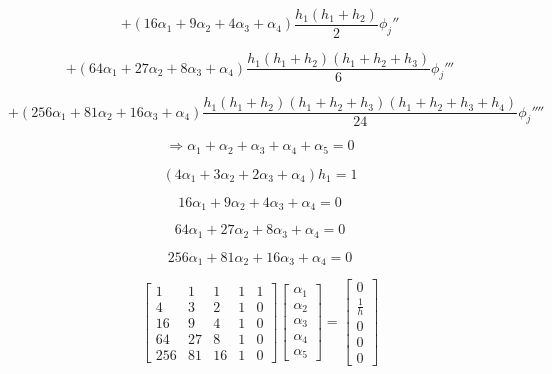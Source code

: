 \documentclass[12pt,a4paper]{report}
\begin{document}
\begin{enumerate}
$$+ \left(16\alpha_1 + 9\alpha_2 + 4\alpha_3 + \alpha_4\right)\frac{h_1\left(h_1 + h_2\right)}{2}{\phi_j}''$$

$$+ \left(64\alpha_1 + 27\alpha_2 + 8\alpha_3 + \alpha_4\right)\frac{h_1\left(h_1 + h_2\right)\left(h_1 + h_2 + h_3\right)}{6}{\phi_j}'''$$

$$+ \left(256\alpha_1 + 81\alpha_2 + 16\alpha_3 + \alpha_4\right)\frac{h_1\left(h_1 + h_2\right)\left(h_1 + h_2 + h_3\right)\left(h_1 + h_2 + h_3 + h_4\right)}{24}{\phi_j}''''$$

$$\Rightarrow \alpha_1 + \alpha_2 + \alpha_3 + \alpha_4 + \alpha_5 = 0$$

$$\left(4\alpha_1 + 3\alpha_2 + 2\alpha_3 + \alpha_4\right)h_1 = 1$$

$$16\alpha_1 + 9\alpha_2 + 4\alpha_3 + \alpha_4 = 0$$

$$64\alpha_1 + 27\alpha_2 + 8\alpha_3 + \alpha_4 = 0$$

$$256\alpha_1 + 81\alpha_2 + 16\alpha_3 + \alpha_4 = 0$$

$$\begin{bmatrix}
1 & 1 & 1 & 1 & 1 \\
4 & 3 & 2 & 1 & 0 \\
16 & 9 & 4 & 1 & 0 \\
64 & 27 & 8 & 1 & 0 \\
256 & 81 & 16 & 1 & 0
\end{bmatrix}
\begin{bmatrix}
\alpha_1 \\ \alpha_2 \\ \alpha_3 \\ \alpha_4 \\ \alpha_5
\end{bmatrix} = 
\begin{bmatrix}
0 \\ \frac{1}{h} \\ 0 \\ 0 \\ 0
\end{bmatrix}$$

\pagebreak


\end{enumerate}
\end{document}
